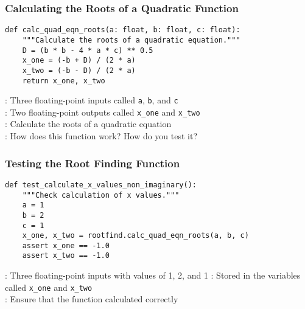 \documentclass[14pt,aspectratio=169]{beamer}
\begin{document}
%
\begin{frame}[fragile]
  \frametitle{Calculating the Roots of a Quadratic Function}
  \hspace*{-.1in}
  \begin{minipage}{6in}
    \vspace*{.2in}
    \begin{verbatim}
def calc_quad_eqn_roots(a: float, b: float, c: float):
    """Calculate the roots of a quadratic equation."""
    D = (b * b - 4 * a * c) ** 0.5
    x_one = (-b + D) / (2 * a)
    x_two = (-b - D) / (2 * a)
    return x_one, x_two
    \end{verbatim}
  \end{minipage}
  \vspace*{.05in}
  \begin{center}
    \normalsize {}: Three floating-point inputs called {\tt a}, {\tt b}, and {\tt c}\\
    \normalsize {}: Two floating-point outputs called {\tt x\_one} and {\tt x\_two}\\
    \normalsize {}: Calculate the roots of a quadratic equation\\
    \normalsize {}: How does this function work? How do you test it?
  \end{center}
\end{frame}

%
\begin{frame}[fragile]
  \frametitle{Testing the Root Finding Function}
  \hspace*{-.1in}
  \begin{minipage}{6in}
    \vspace*{.2in}
    \begin{verbatim}
def test_calculate_x_values_non_imaginary():
    """Check calculation of x values."""
    a = 1
    b = 2
    c = 1
    x_one, x_two = rootfind.calc_quad_eqn_roots(a, b, c)
    assert x_one == -1.0
    assert x_two == -1.0
    \end{verbatim}
  \end{minipage}
  \vspace*{.05in}
  \begin{center}
    \normalsize {}: Three floating-point inputs with values of 1, 2, and 1
    \normalsize {}: Stored in the variables called {\tt x\_one} and {\tt x\_two}\\
    \normalsize {}: Ensure that the function calculated correctly\\
  \end{center}
\end{frame}
\end{document}
